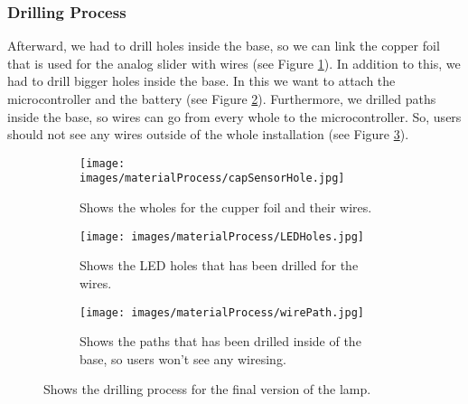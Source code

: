 \documentclass[04.3_buildingProcess.tex]{subfiles}
\begin{document}
    \subsubsection{Drilling Process}
    \begin{flushleft}
        \noindent
        Afterward, we had to drill holes inside the base, so we can link the copper foil that is 
        used for the analog slider with wires (see Figure \ref{fig:capSensorHole}). In addition to 
        this, we had to drill bigger holes inside the base. In this we want to attach the 
        microcontroller and the battery (see Figure \ref{fig:LEDHoles}). Furthermore, we drilled 
        paths inside the base, so wires can go from every whole to the microcontroller. So, users 
        should not see any wires outside of the whole installation (see Figure \ref{fig:wirePath}).

        \begin{figure}[H]
            \centering
            \begin{subfigure}{.45\textwidth}
            \centering
            \texttt{[image: images/materialProcess/capSensorHole.jpg]}
            \caption{Shows the wholes for the cupper foil and their wires.}
            \label{fig:capSensorHole}
            \vspace{6mm}
            \end{subfigure}
            \medskip
            \hspace{1mm}
            \begin{subfigure}{.45\textwidth}
                \centering
                \texttt{[image: images/materialProcess/LEDHoles.jpg]}
                \caption{Shows the LED holes that has been drilled for the wires.}
                \label{fig:LEDHoles}
                \vspace{6mm}
            \end{subfigure}
            \hspace{1mm}
            \begin{subfigure}{.45\textwidth}
                \centering
                \texttt{[image: images/materialProcess/wirePath.jpg]}
                \caption{Shows the paths that has been drilled inside of the base, so 
                users won't see any wiresing.}
                \label{fig:wirePath}
                \vspace{6mm}
            \end{subfigure}
            \caption{Shows the drilling process for the final version of the lamp.}
            \label{fig:drillingProcess}
        \end{figure}
    \end{flushleft}
\end{document}

